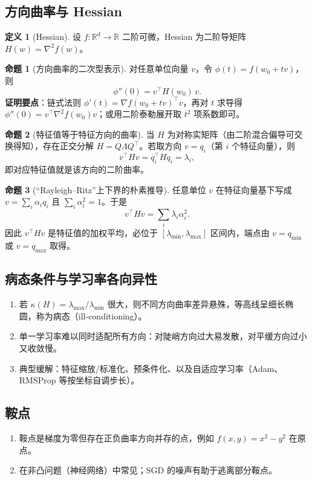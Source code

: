 \documentclass[10.5pt,hyperref,a4paper,UTF8]{ctexart}
\theoremstyle{definition}
\newtheorem{definition}{定义}
\newtheorem{proposition}{命题}
\begin{document}
\subsection{方向曲率与 Hessian}
\begin{definition}[Hessian]
设 $f:\mathbb{R}^d\to\mathbb{R}$ 二阶可微，Hessian 为二阶导矩阵 $H(w)=\nabla^2 f(w)$。
\end{definition}

\begin{proposition}[方向曲率的二次型表示]
对任意单位向量 $v$，令 $\phi(t)=f(w_0+t v)$，则
\[
\phi''(0)=v^\top H(w_0)\,v.
\]
\textbf{证明要点}：链式法则 $\phi'(t)=\nabla f(w_0+tv)^\top v$，再对 $t$ 求导得 $\phi''(0)=v^\top \nabla^2 f(w_0)v$；或用二阶泰勒展开取 $t^2$ 项系数即可。
\end{proposition}

\begin{proposition}[特征值等于特征方向的曲率]
当 $H$ 为对称实矩阵（由二阶混合偏导可交换得知），存在正交分解 $H=Q\Lambda Q^\top$。若取方向 $v=q_i$（第 $i$ 个特征向量），则
\[
v^\top H v=q_i^\top H q_i=\lambda_i,
\]
即对应特征值就是该方向的二阶曲率。
\end{proposition}

\begin{proposition}[“Rayleigh–Ritz”上下界的朴素推导]
任意单位 $v$ 在特征向量基下写成 $v=\sum_i \alpha_i q_i$ 且 $\sum_i \alpha_i^2=1$。于是
\[
v^\top H v=\sum_i \lambda_i \alpha_i^2.
\]
因此 $v^\top H v$ 是特征值的加权平均，必位于 $[\lambda_{\min},\lambda_{\max}]$ 区间内，端点由 $v=q_{\min}$ 或 $v=q_{\max}$ 取得。
\end{proposition}

\subsection{病态条件与学习率各向异性}
\begin{enumerate}
  \item 若 $\kappa(H)=\lambda_{\max}/\lambda_{\min}$ 很大，则不同方向曲率差异悬殊，等高线呈细长椭圆，称为病态（ill-conditioning）。
  \item 单一学习率难以同时适配所有方向：对陡峭方向过大易发散，对平缓方向过小又收敛慢。
  \item 典型缓解：特征缩放/标准化、预条件化、以及自适应学习率（Adam、RMSProp 等按坐标自调步长）。
\end{enumerate}

\subsection{鞍点}
\begin{enumerate}
  \item 鞍点是梯度为零但存在正负曲率方向并存的点，例如 $f(x,y)=x^2-y^2$ 在原点。
  \item 在非凸问题（神经网络）中常见；SGD 的噪声有助于逃离部分鞍点。
\end{enumerate}
\end{document}
